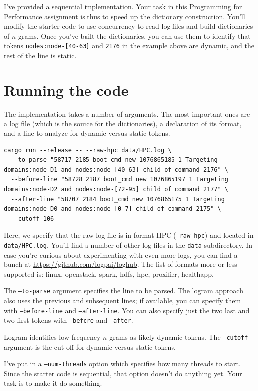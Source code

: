 \documentclass[12pt]{article}
\renewcommand{\_}{\kern-1.5pt\textunderscore\kern-1.5pt}
\begin{document}
I've provided a sequential implementation. Your task in this Programming for Performance assignment is thus to speed up the dictionary construction. You'll modify the starter code to use concurrency to read log files and build dictionaries of $n$-grams. Once you've built the dictionaries, you can use them to identify that tokens \texttt{nodes:node-[40-63]} and \texttt{2176} in the example above are dynamic, and the rest of the line is static.

\section*{Running the code}
The implementation takes a number of arguments. The most important ones are a log file (which is the source for the dictionaries), a declaration of its format, and a line to analyze for dynamic versus static tokens.

{\tiny
\begin{verbatim}
cargo run --release -- --raw-hpc data/HPC.log \
  --to-parse "58717 2185 boot_cmd new 1076865186 1 Targeting domains:node-D1 and nodes:node-[40-63] child of command 2176" \
  --before-line "58728 2187 boot_cmd new 1076865197 1 Targeting domains:node-D2 and nodes:node-[72-95] child of command 2177" \
  --after-line "58707 2184 boot_cmd new 1076865175 1 Targeting domains:node-D0 and nodes:node-[0-7] child of command 2175" \
  --cutoff 106
\end{verbatim}
}

Here, we specify that the raw log file is in format HPC (\texttt{--raw-hpc}) and located in \texttt{data/HPC.log}. You'll find a number of other log files in the \texttt{data} subdirectory. In case you're curious about experimenting with even more logs, you can find a bunch at \url{https://github.com/logpai/loghub}. The list of formats more-or-less supported is: linux, openstack, spark, hdfs, hpc, proxifier, healthapp.

The \texttt{--to-parse} argument specifies the line to be parsed. The logram approach also uses the previous and subsequent lines; if available, you can specify them with \texttt{--before-line} and \texttt{--after-line}. You can also specify just the two last and two first tokens with \texttt{--before} and \texttt{--after}.

Logram identifies low-frequency $n$-grams as likely dynamic tokens. The \texttt{--cutoff} argument is the cut-off for dynamic versus static tokens.

I've put in a \texttt{--num-threads} option which specifies how many threads to start. Since the starter code is sequential, that option doesn't do anything yet. Your task is to make it do something.
\end{document}
